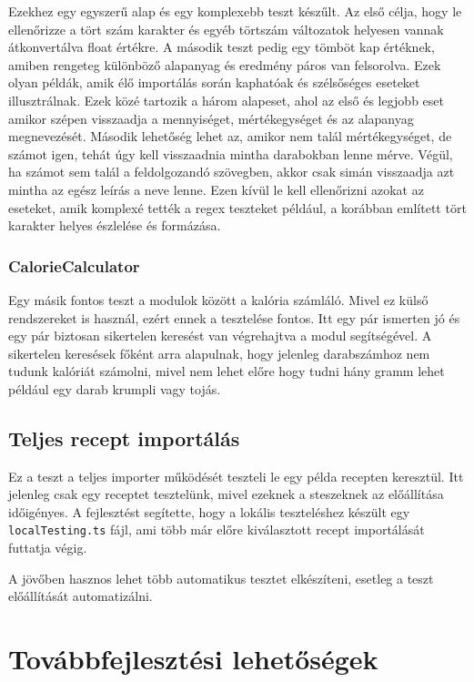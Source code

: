 \documentclass[12pt]{report}
\theoremstyle{definition}
\begin{document}
Ezekhez egy egyszerű alap és egy komplexebb teszt készűlt. Az első célja, hogy le ellenőrizze a tört szám karakter és egyéb törtszám változatok helyesen vannak átkonvertálva float értékre. A második teszt pedig egy tömböt kap értéknek, amiben rengeteg különböző alapanyag és eredmény páros van felsorolva. Ezek olyan példák, amik élő importálás során kaphatóak és szélsőséges eseteket illusztrálnak. Ezek közé tartozik a három alapeset, ahol az első és legjobb eset amikor szépen visszaadja a mennyiséget, mértékegységet és az alapanyag megnevezését. Második lehetőség lehet az, amikor nem talál mértékegységet, de számot igen, tehát úgy kell visszaadnia mintha darabokban lenne mérve. Végül, ha számot sem talál a feldolgozandó szövegben, akkor csak simán visszaadja azt mintha az egész leírás a neve lenne. Ezen kívül le kell ellenőrizni azokat az eseteket, amik komplexé tették a \Gls{regex} teszteket például, a korábban említett tört karakter helyes észlelése és formázása.


\subsection{CalorieCalculator}
Egy másik fontos teszt a modulok között a kalória számláló. Mivel ez külső rendszereket is használ, ezért ennek a tesztelése fontos. Itt egy pár ismerten jó és egy pár biztosan sikertelen keresést van végrehajtva a modul segítségével. A sikertelen keresések főként arra alapulnak, hogy jelenleg darabszámhoz nem tudunk kalóriát számolni, mivel nem lehet előre hogy tudni hány gramm lehet például egy darab krumpli vagy tojás.

\section{Teljes recept importálás}
Ez a teszt a teljes importer működését teszteli le egy példa recepten keresztül. Itt jelenleg csak egy receptet tesztelünk, mivel ezeknek a steszeknek az előállítása időigényes.
A fejlesztést segítette, hogy a lokális teszteléshez készült egy \texttt{localTesting.ts} fájl, ami több már előre kiválasztott recept importálását futtatja végig.

A jövőben hasznos lehet több automatikus tesztet elkészíteni, esetleg a teszt előállítását automatizálni.


\chapter{Továbbfejlesztési lehetőségek}
\end{document}
